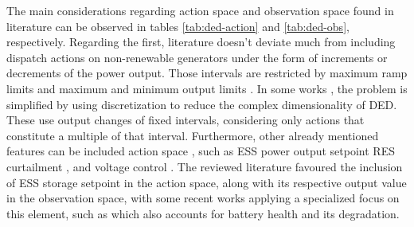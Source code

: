 The main considerations regarding action space and observation space found in literature can be observed in tables \ref{tab:ded-action} and \ref{tab:ded-obs}, respectively. Regarding the first, literature doesn't deviate much from including dispatch actions on non-renewable generators under the form of increments or decrements of the power output. Those intervals are restricted by maximum ramp limits and maximum and minimum output limits \cite{liNovelGraphReinforcement2022, chenScalableGraphReinforcement2023}. In some works \cite{zhaoGraphbasedDeepReinforcement2022}, the problem is simplified by using discretization to reduce the complex dimensionality of \ac{DED}. These use output changes of fixed intervals, considering only actions that constitute a multiple of that interval.
Furthermore, other already mentioned features can be included action space , such as \ac{ESS} power output setpoint \cite{zhaoGraphbasedDeepReinforcement2022, liNovelGraphReinforcement2022, chenScalableGraphReinforcement2023, liuDistributedEconomicDispatch2018, yangDynamicEnergyDispatch2021, xingRealtimeOptimalScheduling2023} \acf{RES} curtailment \cite{zhaoGraphbasedDeepReinforcement2022, liNovelGraphReinforcement2022, chenScalableGraphReinforcement2023, xingRealtimeOptimalScheduling2023}, and voltage control \cite{hanAutonomousControlTechnology2023, xingRealtimeOptimalScheduling2023}. The reviewed literature favoured the inclusion of \ac{ESS} storage setpoint in the action space, along with its respective output value in the observation space, with some recent works applying a specialized focus on this element, such as \cite{liuDistributedEconomicDispatch2018} which also accounts for battery health and its degradation.

